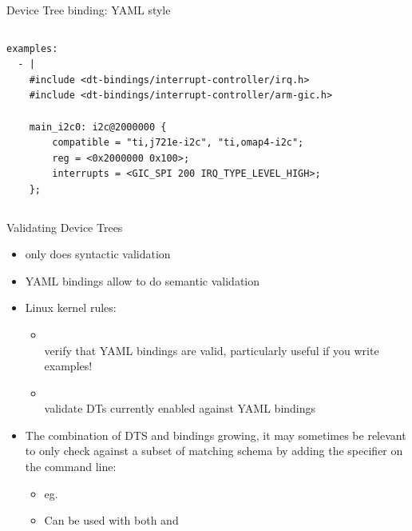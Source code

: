\begin{frame}[fragile]{Device Tree binding: YAML style}
\begin{columns}[t]
\begin{block}{}
{\begin{verbatim}
examples:
  - |
    #include <dt-bindings/interrupt-controller/irq.h>
    #include <dt-bindings/interrupt-controller/arm-gic.h>

    main_i2c0: i2c@2000000 {
        compatible = "ti,j721e-i2c", "ti,omap4-i2c";
        reg = <0x2000000 0x100>;
        interrupts = <GIC_SPI 200 IRQ_TYPE_LEVEL_HIGH>;
    };
\end{verbatim}
      }
    \end{block}
  \end{columns}
\end{frame}

\begin{frame}{Validating Device Trees}
  \begin{itemize}
  \item {} only does syntactic validation
  \item YAML bindings allow to do semantic validation
  \item Linux kernel  rules:
    \begin{itemize}
    \item {}\\
      verify that YAML bindings are valid, particularly useful if you
      write examples!
    \item {}\\
      validate DTs currently enabled against YAML bindings
    \end{itemize}
  \item The combination of DTS and bindings growing, it may sometimes be
    relevant to only check against a subset of matching schema by adding
    the  specifier on the  command line:
    \begin{itemize}
    \item eg. \\
    \item Can be used with both  and 
    \end{itemize}
  \end{itemize}
\end{frame}

